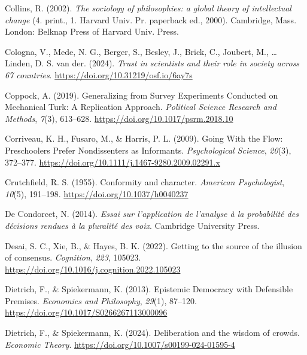 \documentclass[
  doc,floatsintext]{apa6}
\newlength{\cslhangindent}
\newenvironment{CSLReferences}[2] %
 {\begin{list}{}{%
  \setlength{\itemindent}{0pt}
  \setlength{\leftmargin}{0pt}
  \setlength{\parsep}{0pt}
  \ifodd #1
   \setlength{\leftmargin}{\cslhangindent}
   \setlength{\itemindent}{-1\cslhangindent}
  \fi
  \setlength{\itemsep}{#2\baselineskip}}}
 {\end{list}}
\begin{document}
\begin{CSLReferences}{1}{0}
Collins, R. (2002). \emph{The sociology of philosophies: a global theory of intellectual change} (4. print., 1. Harvard Univ. Pr. paperback ed., 2000). Cambridge, Mass. London: Belknap Press of Harvard Univ. Press.

Cologna, V., Mede, N. G., Berger, S., Besley, J., Brick, C., Joubert, M., \ldots{} Linden, D. S. van der. (2024). \emph{Trust in scientists and their role in society across 67 countries}. \url{https://doi.org/10.31219/osf.io/6ay7s}

Coppock, A. (2019). Generalizing from Survey Experiments Conducted on Mechanical Turk: A Replication Approach. \emph{Political Science Research and Methods}, \emph{7}(3), 613--628. \url{https://doi.org/10.1017/psrm.2018.10}

Corriveau, K. H., Fusaro, M., \& Harris, P. L. (2009). Going With the Flow: Preschoolers Prefer Nondissenters as Informants. \emph{Psychological Science}, \emph{20}(3), 372--377. \url{https://doi.org/10.1111/j.1467-9280.2009.02291.x}

Crutchfield, R. S. (1955). Conformity and character. \emph{American Psychologist}, \emph{10}(5), 191--198. \url{https://doi.org/10.1037/h0040237}

De Condorcet, N. (2014). \emph{Essai sur l'application de l'analyse à la probabilité des décisions rendues à la pluralité des voix}. Cambridge University Press.

Desai, S. C., Xie, B., \& Hayes, B. K. (2022). Getting to the source of the illusion of consensus. \emph{Cognition}, \emph{223}, 105023. \url{https://doi.org/10.1016/j.cognition.2022.105023}

Dietrich, F., \& Spiekermann, K. (2013). Epistemic Democracy with Defensible Premises. \emph{Economics and Philosophy}, \emph{29}(1), 87--120. \url{https://doi.org/10.1017/S0266267113000096}

Dietrich, F., \& Spiekermann, K. (2024). Deliberation and the wisdom of crowds. \emph{Economic Theory}. \url{https://doi.org/10.1007/s00199-024-01595-4}


\end{CSLReferences}
\end{document}
